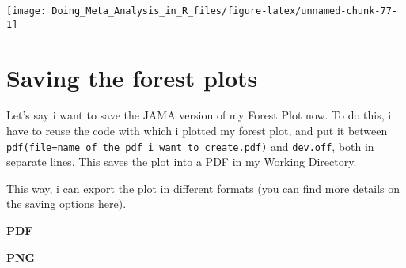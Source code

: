 \documentclass[]{book}
\newenvironment{Shaded}{\begin{snugshade}}{\end{snugshade}}
\newcommand{\KeywordTok}[1]{\textcolor[rgb]{0.13,0.29,0.53}{\textbf{#1}}}
\newcommand{\DataTypeTok}[1]{\textcolor[rgb]{0.13,0.29,0.53}{#1}}
\newcommand{\DecValTok}[1]{\textcolor[rgb]{0.00,0.00,0.81}{#1}}
\newcommand{\StringTok}[1]{\textcolor[rgb]{0.31,0.60,0.02}{#1}}
\newcommand{\NormalTok}[1]{#1}
\theoremstyle{definition}
\theoremstyle{definition}
\theoremstyle{definition}
\theoremstyle{remark}
\begin{document}
\begin{center}\texttt{[image: Doing\_Meta\_Analysis\_in\_R\_files/figure-latex/unnamed-chunk-77-1]} \end{center}

\section{Saving the forest plots}\label{saving-the-forest-plots}

Let's say i want to save the JAMA version of my Forest Plot now. To do
this, i have to reuse the code with which i plotted my forest plot, and
put it between
\texttt{pdf(file=\textquotesingle{}name\_of\_the\_pdf\_i\_want\_to\_create.pdf\textquotesingle{})}
and \texttt{dev.off}, both in separate lines. This saves the plot into a
PDF in my Working Directory.

This way, i can export the plot in different formats (you can find more
details on the saving options \protect\hyperlink{saving}{here}).

\textbf{PDF}

\begin{Shaded}
\end{Shaded}

\textbf{PNG}

\begin{Shaded}
\end{Shaded}
\end{document}
